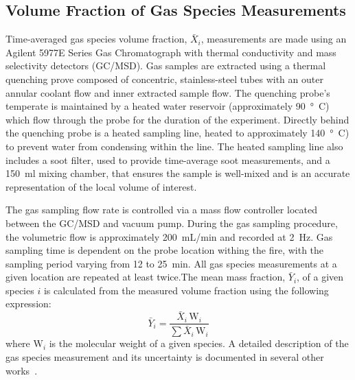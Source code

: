 \documentclass[12pt]{ussci}
\begin{document}
\subsection{Volume Fraction of Gas Species Measurements}
Time-averaged gas species volume fraction, $\bar{X}_{i}$, measurements are made using an Agilent 5977E Series Gas Chromatograph with thermal conductivity and mass selectivity detectors (GC/MSD). Gas samples are extracted using a thermal quenching prove composed of concentric, stainless-steel tubes with an outer annular coolant flow and inner extracted sample flow. The quenching probe's temperate is maintained by a heated water reservoir (approximately \SI{90}{\degree C}) which flow through the probe for the duration of the experiment. Directly behind the quenching probe is a heated sampling line, heated to approximately \SI{140}{\degree C}) to prevent water from condensing within the line. The heated sampling line also includes a soot filter, used to provide time-average soot measurements, and a 150~ml mixing chamber, that ensures the sample is well-mixed and is an accurate representation of the local volume of interest.

The gas sampling flow rate is controlled via a mass flow controller located between the GC/MSD and vacuum pump. During the gas sampling procedure, the volumetric flow is approximately 200~mL/min and recorded at 2~Hz. Gas sampling time is dependent on the probe location withing the fire, with the sampling period varying from 12 to 25~min. All gas species measurements at a given location are repeated at least twice.The mean mass fraction, $\bar{Y}_{i}$, of a given species $i$ is calculated from the measured volume fraction using the following expression:
\begin{equation}\label{eq:mass_fraction}
	\bar{Y}_{i}=\frac{\bar{X}_{i} \, {\textrm{W}_{i}}}{\sum{\bar{X}_{i} \, {\textrm{W}_{i}}}}
\end{equation}
where ${{\textrm{W}_{i}}}$ is the molecular weight of a given species. A detailed description of the gas species measurement and its uncertainty is documented in several other works~\cite{Falkenstein2021a}. 
\end{document}
